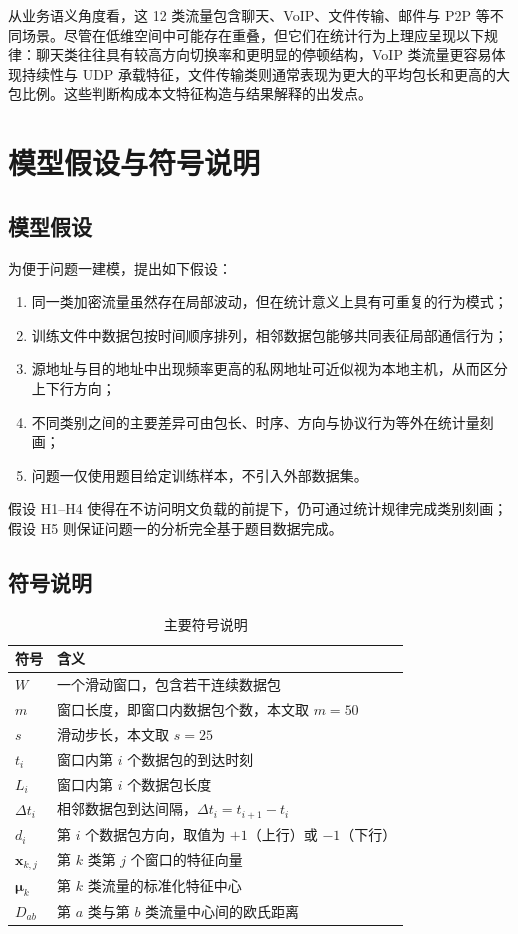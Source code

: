 \documentclass[UTF8,a4paper,12pt]{ctexart}
\begin{document}
从业务语义角度看，这 12 类流量包含聊天、VoIP、文件传输、邮件与 P2P 等不同场景。尽管在低维空间中可能存在重叠，但它们在统计行为上理应呈现以下规律：聊天类往往具有较高方向切换率和更明显的停顿结构，VoIP 类流量更容易体现持续性与 UDP 承载特征，文件传输类则通常表现为更大的平均包长和更高的大包比例。这些判断构成本文特征构造与结果解释的出发点。

\section{模型假设与符号说明}

\subsection{模型假设}
为便于问题一建模，提出如下假设：

\begin{enumerate}[label=\textbf{H\arabic*}]
    \item 同一类加密流量虽然存在局部波动，但在统计意义上具有可重复的行为模式；
    \item 训练文件中数据包按时间顺序排列，相邻数据包能够共同表征局部通信行为；
    \item 源地址与目的地址中出现频率更高的私网地址可近似视为本地主机，从而区分上下行方向；
    \item 不同类别之间的主要差异可由包长、时序、方向与协议行为等外在统计量刻画；
    \item 问题一仅使用题目给定训练样本，不引入外部数据集。
\end{enumerate}

假设 H1--H4 使得在不访问明文负载的前提下，仍可通过统计规律完成类别刻画；假设 H5 则保证问题一的分析完全基于题目数据完成。

\subsection{符号说明}
\begin{table}[H]
\centering
\caption{主要符号说明}
\begin{tabular}{>{\centering\arraybackslash}m{2.8cm} >{\centering\arraybackslash}m{10.5cm}}
\toprule
符号 & 含义 \\
\midrule
$W$ & 一个滑动窗口，包含若干连续数据包 \\
$m$ & 窗口长度，即窗口内数据包个数，本文取 $m=50$ \\
$s$ & 滑动步长，本文取 $s=25$ \\
$t_i$ & 窗口内第 $i$ 个数据包的到达时刻 \\
$L_i$ & 窗口内第 $i$ 个数据包长度 \\
$\Delta t_i$ & 相邻数据包到达间隔，$\Delta t_i=t_{i+1}-t_i$ \\
$d_i$ & 第 $i$ 个数据包方向，取值为 $+1$（上行）或 $-1$（下行） \\
$\bm{x}_{k,j}$ & 第 $k$ 类第 $j$ 个窗口的特征向量 \\
$\bm{\mu}_k$ & 第 $k$ 类流量的标准化特征中心 \\
$D_{ab}$ & 第 $a$ 类与第 $b$ 类流量中心间的欧氏距离 \\
\bottomrule
\end{tabular}
\end{table}
\end{document}

